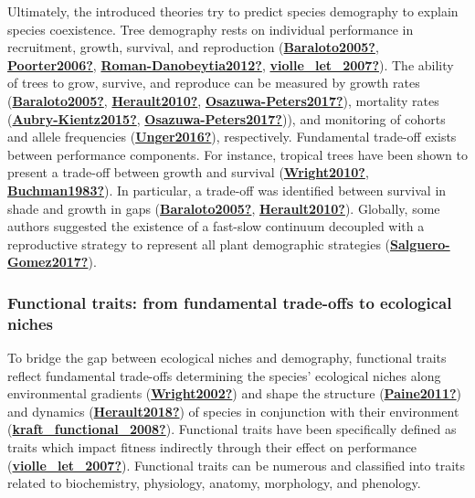 \documentclass[12pt,twoside,a4paper, a]{article}
\begin{document}
Ultimately, the introduced theories try to predict species demography to explain species coexistence.
Tree demography rests on individual performance in recruitment, growth, survival, and reproduction (\protect\hyperlink{ref-Baraloto2005}{\textbf{Baraloto2005?}}, \protect\hyperlink{ref-Poorter2006}{\textbf{Poorter2006?}}, \protect\hyperlink{ref-Roman-Danobeytia2012}{\textbf{Roman-Danobeytia2012?}}, \protect\hyperlink{ref-violle_let_2007}{\textbf{violle\_let\_2007?}}).
The ability of trees to grow, survive, and reproduce can be measured
by growth rates (\protect\hyperlink{ref-Baraloto2005}{\textbf{Baraloto2005?}}, \protect\hyperlink{ref-Herault2010}{\textbf{Herault2010?}}, \protect\hyperlink{ref-Osazuwa-Peters2017}{\textbf{Osazuwa-Peters2017?}}),
mortality rates (\protect\hyperlink{ref-Aubry-Kientz2015}{\textbf{Aubry-Kientz2015?}}, \protect\hyperlink{ref-Osazuwa-Peters2017}{\textbf{Osazuwa-Peters2017?}})),
and monitoring of cohorts and allele frequencies (\protect\hyperlink{ref-Unger2016}{\textbf{Unger2016?}}),
respectively.
Fundamental trade-off exists between performance components.
For instance, tropical trees have been shown to present a trade-off between growth and survival (\protect\hyperlink{ref-Wright2010}{\textbf{Wright2010?}}, \protect\hyperlink{ref-Buchman1983}{\textbf{Buchman1983?}}).
In particular, a trade-off was identified between survival in shade and growth in gaps (\protect\hyperlink{ref-Baraloto2005}{\textbf{Baraloto2005?}}, \protect\hyperlink{ref-Herault2010}{\textbf{Herault2010?}}).
Globally, some authors suggested the existence of a fast-slow continuum decoupled with a reproductive strategy to represent all plant demographic strategies (\protect\hyperlink{ref-Salguero-Gomez2017}{\textbf{Salguero-Gomez2017?}}).

\hypertarget{functional-traits-from-fundamental-trade-offs-to-ecological-niches}{%
\subsubsection{Functional traits: from fundamental trade-offs to ecological niches}\label{functional-traits-from-fundamental-trade-offs-to-ecological-niches}}

To bridge the gap between ecological niches and demography, functional traits reflect fundamental trade-offs determining the species' ecological niches along environmental gradients (\protect\hyperlink{ref-Wright2002}{\textbf{Wright2002?}}) and shape the structure (\protect\hyperlink{ref-Paine2011}{\textbf{Paine2011?}}) and dynamics (\protect\hyperlink{ref-Herault2018}{\textbf{Herault2018?}}) of species in conjunction with their environment (\protect\hyperlink{ref-kraft_functional_2008}{\textbf{kraft\_functional\_2008?}}).
Functional traits have been specifically defined as traits which impact fitness indirectly through their effect on performance (\protect\hyperlink{ref-violle_let_2007}{\textbf{violle\_let\_2007?}}).
Functional traits can be numerous and classified into traits related to biochemistry, physiology, anatomy, morphology, and phenology.
\end{document}

